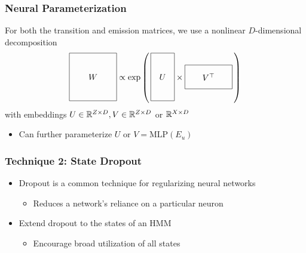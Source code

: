 \documentclass{beamer}
\begin{document}
\begin{frame}
\frametitle{Neural Parameterization}
For both the transition and emission matrices,
we use a nonlinear $D$-dimensional decomposition
\vspace{1em}
\[
\vcenter{\hbox{\begin{tikzpicture}[baseline=-0.5ex]
    \draw (0,0) rectangle (2,2) node[pos=.5] {$W$};
\end{tikzpicture}}}
\propto
\exp\left(\,
\vcenter{\hbox{\begin{tikzpicture}[baseline=-0.5ex]
    \draw (0,0) rectangle (1,2) node[pos=.5] {$U$};
\end{tikzpicture}}}
\times 
\vcenter{\hbox{\begin{tikzpicture}[baseline=-0.5ex]
    \draw (0,0) rectangle (2,1) node[pos=.5] {$V^\top$};
\end{tikzpicture}}}
\,\right)
\]
\vspace{1em}
with embeddings $U\in\mathbb{R}^{Z\times D}, V\in\mathbb{R}^{Z\times D}$ or $\mathbb{R}^{X \times D}$
\vspace{1em}
\begin{itemize}
\item Can further parameterize $U$ or $V = \textrm{MLP}(E_u)$
\end{itemize}
\end{frame}

\begin{frame}
\frametitle{Technique 2: State Dropout}
\begin{itemize}
\item Dropout is a common technique for regularizing neural networks
\vspace{2em}
    \begin{itemize}
    \item Reduces a network's reliance on a particular neuron
    \end{itemize}
\vspace{2em}
\item Extend dropout to the states of an HMM
\vspace{2em}
    \begin{itemize}
    \item Encourage broad utilization of all states
    \end{itemize}
\end{itemize}
\end{frame}
\end{document}
